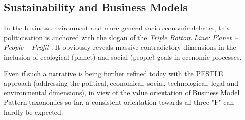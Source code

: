\documentclass[11pt,a4paper]{article}
\begin{document}
\subsection{Sustainability and Business Models}

In the business environment and more general socio-economic debates, this
politicisation is anchored with the slogan of the \emph{Triple Bottom Line:
  Planet -- People -- Profit} \cite{Elkington1997}. It obviously reveals
massive contradictory dimensions in the inclusion of ecological (planet) and
social (people) goals in economic processes.

Even if such a narrative is being further refined today with the PESTLE
approach (addressing the political, economical, social, technological, legal
and environmental dimensions), in view of the value orientation of Business
Model Pattern taxonomies so far, a consistent orientation towards all three
"P" can hardly be expected.
\end{document}
